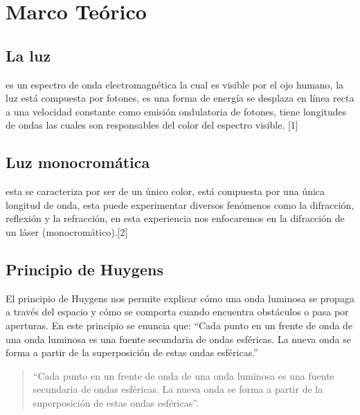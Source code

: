 \documentclass[twocolumn, 12pt]{article}
\begin{document}
\section{Marco Teórico}

\subsection{La luz~\cite{luz}}

es un espectro de onda electromagnética la cual es visible
por el ojo humano, la luz está compuesta por fotones, es
una forma de energía se desplaza en línea recta a una
velocidad constante como emisión ondulatoria de fotones,
tiene longitudes de ondas las cuales son responsables del
color del espectro visible. [1]

\subsection{Luz monocromática~\cite{Tamiko_2023}}

esta se caracteriza por ser de un único color, está
compuesta por una única longitud de onda, esta puede
experimentar diversos fenómenos como la difracción,
reflexión y la refracción, en esta experiencia nos
enfocaremos en la difracción de un láser
(monocromático).[2]

\subsection{Principio de Huygens}

El principio de Huygens nos permite explicar cómo una onda
luminosa se propaga a través del espacio y cómo se comporta
cuando encuentra obstáculos o pasa por aperturas. En este
principio se enuncia que: “Cada punto en un frente de onda
de una onda luminosa es una fuente secundaria de ondas
esféricas. La nueva onda se forma a partir de la
superposición de estas ondas esféricas.”

\begin{quotation}
      ``Cada punto en un frente de onda de una onda luminosa
      es una fuente secundaria de ondas esféricas. La nueva
      onda se forma a partir de la superposición de estas
      ondas esféricas''.
\end{quotation}
\end{document}
